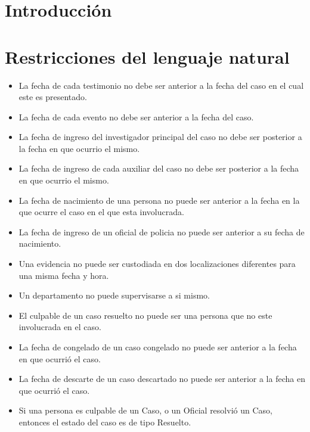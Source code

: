 \documentclass[11pt, a4paper]{article}
\begin{document}

\maketitle
\newpage

\tableofcontents
\newpage

%
\section{Introducción}
% 

\section{Restricciones del lenguaje natural}
\begin{itemize}
	\item La fecha de cada testimonio no debe ser anterior a la fecha del caso en el cual este es presentado.
	\item La fecha de cada evento no debe ser anterior a la fecha del caso.
	\item La fecha de ingreso del investigador principal del caso no debe ser posterior a la fecha en que ocurrio el mismo.
	\item La fecha de ingreso de cada auxiliar del caso no debe ser posterior a la fecha en que ocurrio el mismo.
	\item La fecha de nacimiento de una persona no puede ser anterior a la fecha en la que ocurre el caso en el que esta involucrada.
	\item La fecha de ingreso de un oficial de policia no puede ser anterior a su fecha de nacimiento.
	\item Una evidencia no puede ser custodiada en dos localizaciones diferentes para una misma fecha y hora.
	\item Un departamento no puede supervisarse a si mismo.
	\item El culpable de un caso resuelto no puede ser una persona que no este involucrada en el caso.
	\item La fecha de congelado de un caso congelado no puede ser anterior a la fecha en que ocurrió el caso.
	\item La fecha de descarte de un caso descartado no puede ser anterior a la fecha en que ocurrió el caso.
	\item Si una persona es culpable de un Caso, o un Oficial resolvió un Caso, entonces el estado del caso es de tipo Resuelto.
\end{itemize}
\end{document}
